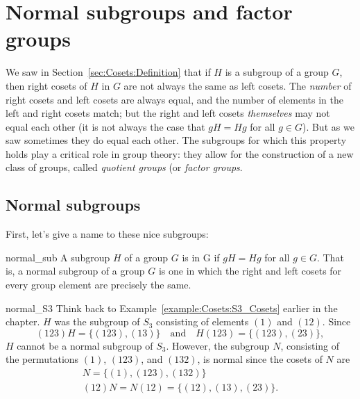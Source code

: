 %
%
%
 
\section{Normal subgroups and factor groups}
\label{sec:Cosets:NormalSubAndFactorGroup}
 
We saw in Section~\ref{sec:Cosets:Definition} that if $H$ is a subgroup of a group $G$, then right cosets of $H$ in $G$ are not always the same as left cosets. The \emph{number} of right cosets and left cosets are always equal, and the number of elements in the left and right cosets match; but the right and left cosets \emph{themselves} may not equal each other (it is not always the case that $gH = Hg$ for all $g \in G$).  But as we saw sometimes they do equal each other. The subgroups for which this property holds play a critical role in group theory: they allow for the construction of a new class of groups, called  \emph{quotient groups} (or \emph{factor groups}. 

\subsection{Normal subgroups}
\label{subsec:Cosets:NormalSubAndFactorGroup:NormalSubgroups}
First, let's give a name to these nice subgroups:

\begin{defn}{normal_sub}
A subgroup $H$ of a group $G$ is  in G if $gH =
Hg$ for all $g \in G$. That is, a normal subgroup of a group $G$ is
one in which the right and left cosets for every group element are precisely the same. 
\end{defn}
 
\begin{example}{normal_S3}
Think back to Example~\ref{example:Cosets:S3_Cosets} earlier in the chapter.  $H$ was the subgroup of $S_3$ consisting of elements $(1)$ and
$(12)$. Since 
\[
(123) H = \{ (123), (13) \}
\quad
\text{and}
\quad
H (123) = \{ (123), (23) \},
\]
$H$ cannot be a normal subgroup of $S_3$.  However, the subgroup $N$,
consisting of the permutations $(1)$, $(123)$, and $(132)$, is normal
since the cosets of $N$ are 
\[
\begin{array}{c}
N  =   \{ (1), (123), (132) \} \\
(12) N =  N (12)  =  \{ (12), (13), (23) \}.
\end{array}
\]
\end{example}

